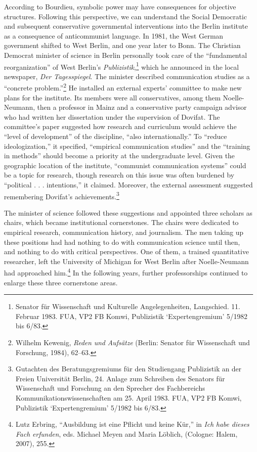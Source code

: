 \documentclass{tufte-handout}
\begin{document}
According to Bourdieu, symbolic power may have consequences for
objective structures. Following this perspective, we can understand the
Social Democratic and subsequent conservative governmental interventions
into the Berlin institute as a consequence of anticommunist language. In
1981, the West German government shifted to West Berlin, and one year
later to Bonn. The Christian Democrat minister of science in Berlin
personally took care of the ``fundamental reorganization'' of West
Berlin's \emph{Publizistik},\footnote{Senator für Wissenschaft und
  Kulturelle Angelegenheiten, Langschied. 11. Februar 1983. FUA, VP2 FB
  Komwi, Publizistik `Expertengremium' 5/1982 bis 6/83.} which he
announced in the local newspaper, \emph{Der Tagesspiegel}. The minister
described communication studies as a ``concrete problem.''\footnote{Wilhelm
  Kewenig, \emph{Reden und Aufsätze} (Berlin: Senator für Wissenschaft
  und Forschung, 1984), 62--63.} He installed an external experts'
committee to make new plans for the institute. Its members were all
conservatives, among them Noelle-Neumann, then a professor in Mainz and
a conservative party campaign advisor who had written her dissertation
under the supervision of Dovifat. The committee's paper suggested how
research and curriculum would achieve the ``level of development'' of
the discipline, ``also internationally.'' To ``reduce ideologization,''
it specified, ``empirical communication studies'' and the ``training in
methods'' should become a priority at the undergraduate level. Given the
geographic location of the institute, ``communist communication
systems'' could be a topic for research, though research on this issue
was often burdened by ``political . . . intentions,'' it claimed.
Moreover, the external assessment suggested remembering Dovifat's
achievements.\footnote{Gutachten des Beratungsgremiums für den
  Studiengang Publizistik an der Freien Universität Berlin, 24. Anlage
  zum Schreiben des Senators für Wissenschaft und Forschung an den
  Sprecher des Fachbereichs Kommunikationswissenschaften am 25. April
  1983. FUA, VP2 FB Komwi, Publizistik `Expertengremium' 5/1982 bis
  6/83.}

The minister of science followed these suggestions and appointed three
scholars as chairs, which became institutional cornerstones. The chairs
were dedicated to empirical research, communication history, and
journalism. The men taking up these positions had had nothing to do with
communication science until then, and nothing to do with critical
perspectives. One of them, a trained quantitative researcher, left the
University of Michigan for West Berlin after Noelle-Neumann had
approached him.\footnote{Lutz Erbring, ``Ausbildung ist eine Pflicht und
  keine Kür,'' in \emph{Ich habe dieses Fach erfunden}, eds. Michael
  Meyen and Maria Löblich, (Cologne: Halem, 2007), 255.} In the
following years, further professorships continued to enlarge these three
cornerstone areas.
\end{document}
